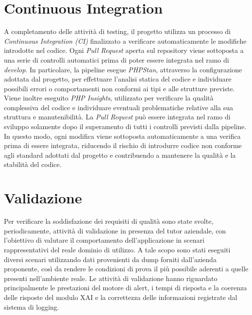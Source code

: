 \section{Continuous Integration}
A completamento delle attività di testing, il progetto utilizza un processo di \textit{Continuous Integration (CI)} finalizzato a verificare automaticamente le modifiche 
introdotte nel codice. Ogni \textit{Pull Request} aperta sul repository viene sottoposta a una serie di controlli automatici prima di poter essere integrata nel ramo di 
\textit{develop}.
\newline
In particolare, la pipeline esegue \textit{PHPStan}, attraverso la configurazione adottata dal progetto, per effettuare l'analisi statica del codice e individuare possibili 
errori o comportamenti non conformi ai tipi e alle strutture previste. Viene inoltre eseguito \textit{PHP Insights}, utilizzato per verificare la qualità complessiva del codice 
e individuare eventuali problematiche relative alla sua struttura e manutenibilità.
\newline
La \textit{Pull Request} può essere integrata nel ramo di sviluppo solamente dopo il superamento di tutti i controlli previsti dalla pipeline. In questo modo, ogni modifica 
viene sottoposta automaticamente a una verifica prima di essere integrata, riducendo il rischio di introdurre codice non conforme agli standard adottati dal progetto e 
contribuendo a mantenere la qualità e la stabilità del codice.

\section{Validazione}
Per verificare la soddisfazione dei requisiti di qualità sono state svolte, periodicamente, attività di validazione in presenza del tutor aziendale, con l'obiettivo di valutare 
il comportamento dell'applicazione in scenari rappresentativi del reale dominio di utilizzo.
\newline
A tale scopo sono stati eseguiti diversi scenari utilizzando dati provenienti da dump forniti dall'azienda proponente, così da rendere le condizioni di prova il più possibile 
aderenti a quelle presenti nell'ambiente reale. Le attività di validazione hanno riguardato principalmente le prestazioni del motore di alert, i tempi di risposta e la coerenza 
delle risposte del modulo XAI e la correttezza delle informazioni registrate dal sistema di logging.

